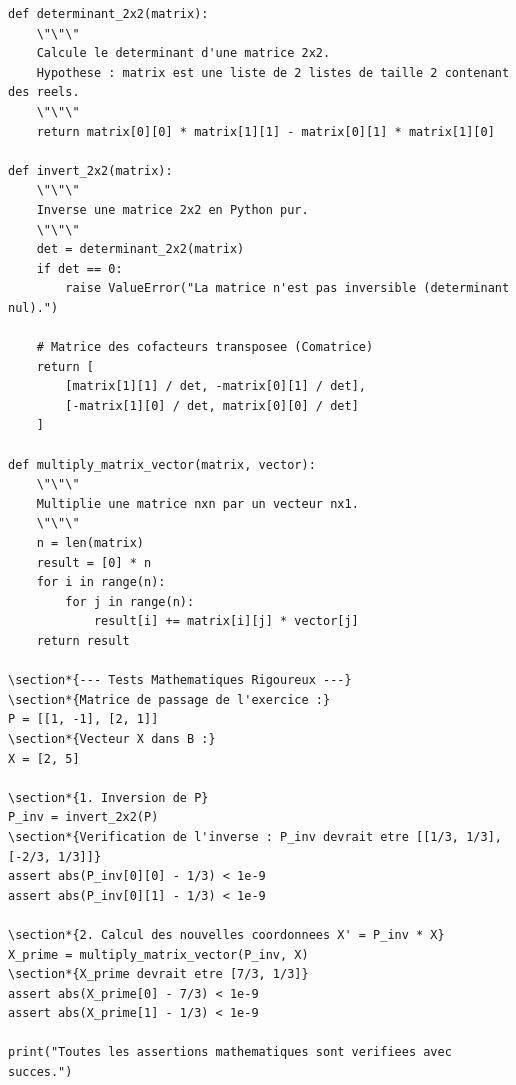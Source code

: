 \documentclass{report}
\begin{document}
\begin{verbatim}
def determinant_2x2(matrix):
    \"\"\"
    Calcule le determinant d'une matrice 2x2.
    Hypothese : matrix est une liste de 2 listes de taille 2 contenant des reels.
    \"\"\"
    return matrix[0][0] * matrix[1][1] - matrix[0][1] * matrix[1][0]

def invert_2x2(matrix):
    \"\"\"
    Inverse une matrice 2x2 en Python pur.
    \"\"\"
    det = determinant_2x2(matrix)
    if det == 0:
        raise ValueError("La matrice n'est pas inversible (determinant nul).")

    # Matrice des cofacteurs transposee (Comatrice)
    return [
        [matrix[1][1] / det, -matrix[0][1] / det],
        [-matrix[1][0] / det, matrix[0][0] / det]
    ]

def multiply_matrix_vector(matrix, vector):
    \"\"\"
    Multiplie une matrice nxn par un vecteur nx1.
    \"\"\"
    n = len(matrix)
    result = [0] * n
    for i in range(n):
        for j in range(n):
            result[i] += matrix[i][j] * vector[j]
    return result

\section*{--- Tests Mathematiques Rigoureux ---}
\section*{Matrice de passage de l'exercice :}
P = [[1, -1], [2, 1]]
\section*{Vecteur X dans B :}
X = [2, 5]

\section*{1. Inversion de P}
P_inv = invert_2x2(P)
\section*{Verification de l'inverse : P_inv devrait etre [[1/3, 1/3], [-2/3, 1/3]]}
assert abs(P_inv[0][0] - 1/3) < 1e-9
assert abs(P_inv[0][1] - 1/3) < 1e-9

\section*{2. Calcul des nouvelles coordonnees X' = P_inv * X}
X_prime = multiply_matrix_vector(P_inv, X)
\section*{X_prime devrait etre [7/3, 1/3]}
assert abs(X_prime[0] - 7/3) < 1e-9
assert abs(X_prime[1] - 1/3) < 1e-9

print("Toutes les assertions mathematiques sont verifiees avec succes.")
\end{verbatim}
\end{document}
